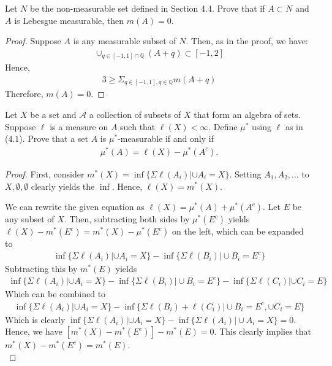 \documentclass[10pt]{article}
\newcommand{\Q}{\mathbb{Q}}
\newenvironment{problem}[2][Problem]{\begin{trivlist}
		\item[\hskip \labelsep {\bfseries #1}\hskip \labelsep {\bfseries #2.}]}{\end{trivlist}}
\begin{document}
	\begin{problem}{13}
		Let $N$ be the non-measurable set defined in Section
		4.4. Prove that if $A \subset N$ and $A$ is Lebesgue measurable, then $m(A) = 0$.
		\begin{proof}
			Suppose $A$ is any measurable subset of $N$. Then, as in the proof, we have:
			\begin{align*}
				\cup_{q \in [-1,1]\cap\Q}(A+q) \subset [-1,2]
			\end{align*}
			Hence,
			\begin{align*}
				3 \geq \Sigma_{q \in [-1,1],q\in\Q} m(A+q)
			\end{align*}
			Therefore, $m(A)=0$.
		\end{proof}
	\end{problem}
	
	\begin{problem}{15}
		Let $X$ be a set and $\mathcal{A}$ a collection of subsets of $X$ that form an algebra of sets. Suppose $\ell$ is a measure on $A$ such that $\ell(X) < \infty$. Define $\mu^*$ using $\ell$ as in (4.1). Prove that a set $A$ is $\mu^*$-measurable if and only if
		\begin{align*}
			\mu^*(A) = \ell(X) - \mu^*(A^c).
		\end{align*}
		\begin{proof}
			First, consider $m^*(X) = \inf\{\Sigma\ell(A_i) | \cup A_i = X\}$. Setting $A_1, A_2, ...$ to $X, \emptyset, \emptyset$ clearly yields the $\inf$. Hence, $\ell(X) = m^*(X)$.
			
			We can rewrite the given equation as $\ell(X) = \mu^*(A) + \mu^*(A^c)$. Let $E$ be any subset of $X$. Then, subtracting both sides by $\mu^*(E^c)$ yields $\ell(X) - m^*(E^c) = m^*(X) - \mu^*(E^c)$ on the left, which can be expanded to
			\begin{align*}
				\inf\{\Sigma \ell(A_i) | \cup A_i = X\} - \inf\{\Sigma \ell(B_i) | \cup B_i = E^c\}
			\end{align*}
			Subtracting this by $m^*(E)$ yields 
			\begin{align*}
				\inf\{\Sigma \ell(A_i) | \cup A_i = X\} - \inf\{\Sigma \ell(B_i) | \cup B_i = E^c\} - \inf\{\Sigma \ell(C_i) | \cup C_i = E\}
			\end{align*}
			Which can be combined to 
			\begin{align*}
				\inf\{\Sigma \ell(A_i) | \cup A_i = X\} - \inf\{\Sigma \ell(B_i) + \ell(C_i) | \cup B_i = E^c, \cup C_i = E \}
			\end{align*}
			Which is clearly $\inf\{\Sigma \ell(A_i) | \cup A_i = X\} - \inf\{\Sigma \ell(A_i) | \cup A_i = X\} = 0$. Hence, we have $[m^*(X) - m^*(E^c)] - m^*(E) = 0$. This clearly implies that $m^*(X) - m^*(E^c) = m^*(E)$.
			\\
			

\end{proof}
\end{problem}
\end{document}
